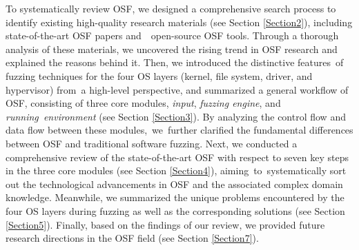 To systematically review OSF, we designed a comprehensive search process to identify existing high-quality research materials (see Section \ref{Section2}), including  state-of-the-art OSF papers and~~open-source OSF tools. Through a thorough analysis of these materials, we uncovered the rising trend in OSF research and explained the reasons behind it. Then, we introduced the distinctive features~of fuzzing techniques for the four OS layers (\ie kernel, file system, driver, and hypervisor) from~a high-level perspective, and summarized a general workflow of OSF, consisting of three core modules, \ie \textit{input}, \textit{fuzzing engine}, and \textit{running~environment} (see Section \ref{Section3}). By analyzing the control flow and data flow between these modules,~we~further clarified the fundamental differences between OSF and traditional software fuzzing. Next, we conducted a comprehensive review of the state-of-the-art OSF with respect to seven key steps in the three core modules (see Section \ref{Section4}), aiming~to~systematically sort out the technological advancements in OSF and the associated complex domain knowledge. Meanwhile, we summarized the unique problems encountered by the four OS layers during fuzzing as well as the corresponding solutions (see Section \ref{Section5}). 
Finally, based on the findings of our review, we provided  future research directions in the OSF field (see Section \ref{Section7}).

